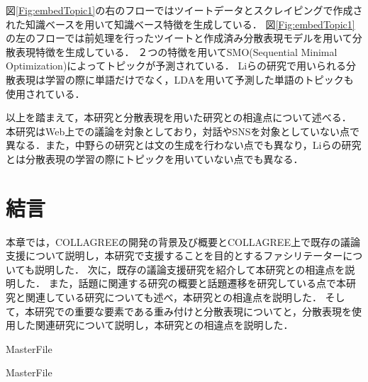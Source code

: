 図\ref{Fig:embedTopic1}の右のフローではツイートデータとスクレイピングで作成された知識ベースを用いて知識ベース特徴を生成している．
図\ref{Fig:embedTopic1}の左のフローでは前処理を行ったツイートと作成済み分散表現モデルを用いて分散表現特徴を生成している．
２つの特徴を用いてSMO(Sequential Minimal Optimization)\cite{SMO}によってトピックが予測されている．
Liらの研究で用いられる分散表現は学習の際に単語だけでなく，LDAを用いて予測した単語のトピックも使用されている．

以上を踏まえて，本研究と分散表現を用いた研究との相違点について述べる．
本研究はWeb上での議論を対象としており，対話やSNSを対象としていない点で異なる．また，中野らの研究とは文の生成を行わない点でも異なり，Liらの研究とは分散表現の学習の際にトピックを用いていない点でも異なる．

\section{結言}
\label{rel:conclusion}
本章では，COLLAGREEの開発の背景及び概要とCOLLAGREE上で既存の議論支援について説明し，本研究で支援することを目的とするファシリテーターについても説明した．
次に，既存の議論支援研究を紹介して本研究との相違点を説明した．
また，話題に関連する研究の概要と話題遷移を研究している点で本研究と関連している研究についても述べ，本研究との相違点を説明した．
そして，本研究での重要な要素である重み付けと分散表現についてと，分散表現を使用した関連研究について説明し，本研究との相違点を説明した．

 \expandafter\ifx\csname MasterFile\endcsname\relax
	\def\BibFile{hoge}
	
  \fi
  \expandafter\ifx\csname MasterFile\endcsname\relax
  
  \fi
